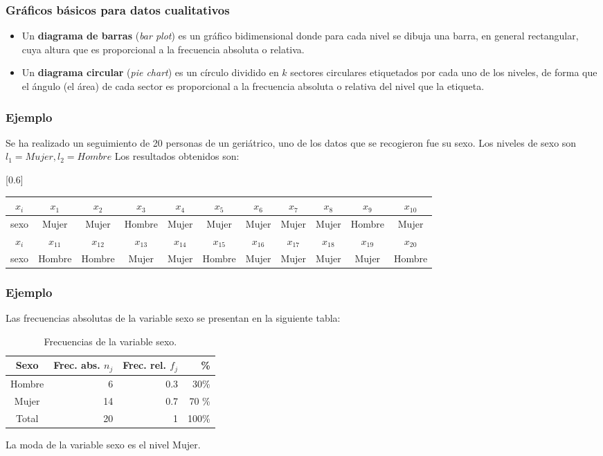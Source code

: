 \begin{frame}
\frametitle{Gráficos básicos  para datos cualitativos}
\begin{itemize}
\item Un \textbf{diagrama de barras} (\textsl{bar plot})  es un gráfico bidimensional  donde para cada nivel  se dibuja una barra, en  general rectangular, cuya altura que es proporcional a la frecuencia absoluta o relativa.
\item Un \textbf{diagrama circular} (\textsl{pie chart}) es un círculo  dividido en $k$ sectores circulares etiquetados por cada uno de los niveles, de forma que el ángulo (el área) de cada sector es proporcional a la frecuencia absoluta  o relativa del nivel que la etiqueta. 
\end{itemize}
\end{frame}

\begin{frame}
\frametitle{Ejemplo}
Se ha realizado un seguimiento  de 20 personas de un geriátrico, uno de los datos que se recogieron fue su sexo. Los niveles de sexo son $l_1=Mujer, l_2=Hombre$
Los resultados obtenidos son:

\smallskip
\begin{center}
{
\scalebox{0.60}[0.6]{ 
\begin{tabular}{|c||cccccccccc|}
\hline
$x_i$ & $x_1$ & $x_2$ & $x_3$ & $x_4$ & $x_5$ & $x_6$ & $ x_7$ & $x_8$ & $x_9$ & $x_{10}$\\ \hline
sexo & Mujer & Mujer & Hombre & Mujer & Mujer & Mujer & Mujer & Mujer & Hombre & Mujer\\\hline
\hline
\hline
$x_i$ & $x_{11}$ & $x_{12}$ & $x_{13}$ & $x_{14}$ & $x_{15}$ & $x_{16}$ & $ x_{17}$ & $x_{18}$ & $x_{19}$ & $x_{20}$\\ \hline
sexo & Hombre & Hombre & Mujer & Mujer & Hombre & Mujer & Mujer & Mujer & Mujer & Hombre\\\hline
\end{tabular}
}}
\end{center}
\end{frame}

\begin{frame}
\frametitle{Ejemplo}
Las frecuencias absolutas de la variable sexo  se presentan en la siguiente tabla:

\begin{table}[h]
\begin{center}
 \caption{Frecuencias de la variable sexo.}
\begin{tabular}{|c||rrr|}
\hline Sexo & Frec. abs. $n_j$ &  Frec. rel. $f_j$ & \% \\\hline\hline
Hombre & 6 & 0.3 & 30\% \\
Mujer & 14 & 0.7 & 70 \% \\\hline
Total & 20 & 1 & 100\% \\\hline
\end{tabular}
\end{center}
\end{table}

La moda de la variable sexo es el nivel Mujer.
\end{frame}


